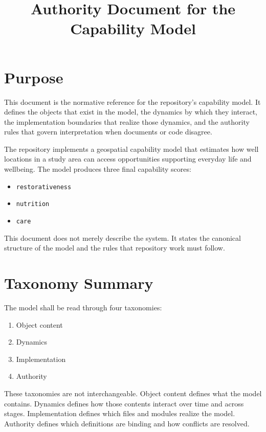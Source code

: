 \documentclass[11pt]{article}
\title{Authority Document for the Capability Model}
\date{}
\begin{document}
\maketitle

\section*{Purpose}

This document is the normative reference for the repository's capability model. It defines the objects that exist in the model, the dynamics by which they interact, the implementation boundaries that realize those dynamics, and the authority rules that govern interpretation when documents or code disagree.

The repository implements a geospatial capability model that estimates how well locations in a study area can access opportunities supporting everyday life and wellbeing. The model produces three final capability scores:

\begin{itemize}
  \item \texttt{restorativeness}
  \item \texttt{nutrition}
  \item \texttt{care}
\end{itemize}

This document does not merely describe the system. It states the canonical structure of the model and the rules that repository work must follow.

\section*{Taxonomy Summary}

The model shall be read through four taxonomies:

\begin{enumerate}
  \item Object content
  \item Dynamics
  \item Implementation
  \item Authority
\end{enumerate}

These taxonomies are not interchangeable. Object content defines what the model contains. Dynamics defines how those contents interact over time and across stages. Implementation defines which files and modules realize the model. Authority defines which definitions are binding and how conflicts are resolved.
\end{document}
